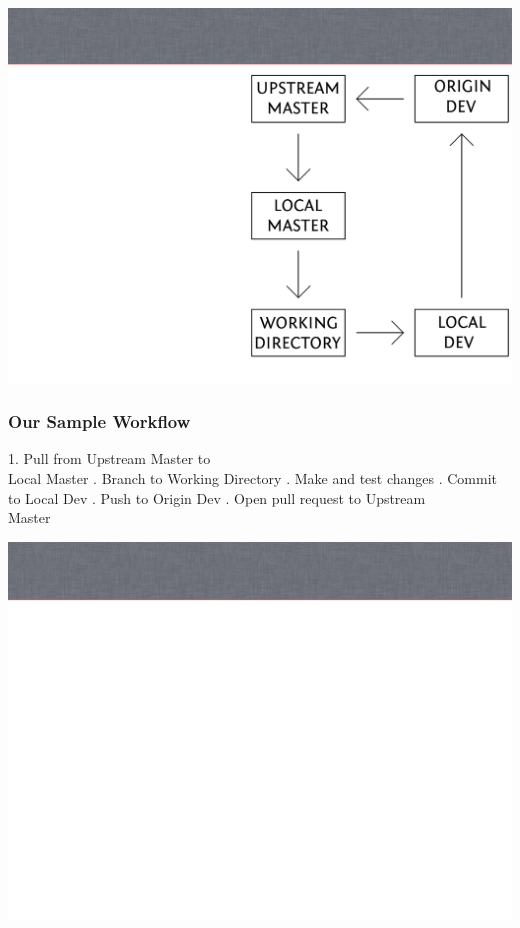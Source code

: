 \documentclass[unknownkeysallowed]{beamer}
\begin{document}
{\includegraphics[width=\paperwidth,height=\paperheight]{assets/workflow_bg}}
\begin{frame}
    \frametitle{Our Sample Workflow}
        1. Pull from Upstream Master to \\
        Local Master \linebreak{}. Branch to Working Directory \linebreak{}. Make and test changes \linebreak{}. Commit to Local Dev \linebreak{}. Push to Origin Dev \linebreak{}. Open pull request to Upstream \\
        Master
\end{frame}
{\includegraphics[width=\paperwidth,height=\paperheight]{assets/slide_bg}}
\end{document}
